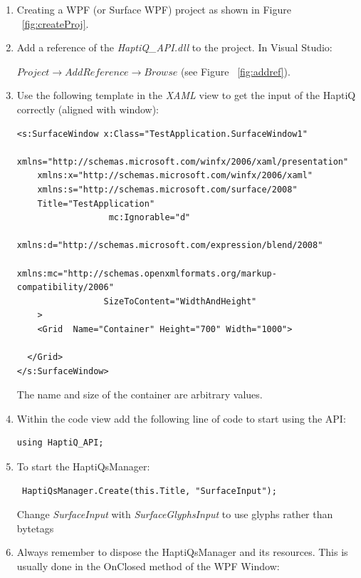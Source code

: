 \documentclass[a4paper]{article}
\begin{document}
\begin{enumerate}
\item Creating a WPF (or Surface WPF) project as shown in Figure ~\ref{fig:createProj}. 

\item Add a reference of the \textit{HaptiQ\_API.dll} to the project. In Visual Studio:

\textit{$ Project \rightarrow Add Reference \rightarrow Browse $} (see Figure ~\ref{fig:addref}).

\item Use the following template in the \textit{XAML} view to get the input of the HaptiQ correctly (aligned with window):

\lstset{language=XML}
\begin{lstlisting}
<s:SurfaceWindow x:Class="TestApplication.SurfaceWindow1"
    xmlns="http://schemas.microsoft.com/winfx/2006/xaml/presentation"
    xmlns:x="http://schemas.microsoft.com/winfx/2006/xaml"
    xmlns:s="http://schemas.microsoft.com/surface/2008"
    Title="TestApplication"
                  mc:Ignorable="d"
                 xmlns:d="http://schemas.microsoft.com/expression/blend/2008" 
                 xmlns:mc="http://schemas.openxmlformats.org/markup-compatibility/2006" 
                 SizeToContent="WidthAndHeight"
    >
    <Grid  Name="Container" Height="700" Width="1000">

  </Grid>
</s:SurfaceWindow>
\end{lstlisting}

The name and size of the container are arbitrary values. 

\item Within the code view add the following line of code to start using the API:
\lstset{style=sharpc1}
\begin{lstlisting}
using HaptiQ_API; 
\end{lstlisting}

\item To start the HaptiQsManager:
\lstset{style=sharpc1}
\begin{lstlisting}
 HaptiQsManager.Create(this.Title, "SurfaceInput");
\end{lstlisting}

Change \textit{SurfaceInput} with \textit{SurfaceGlyphsInput} to use glyphs rather than bytetags

\item Always remember to dispose the HaptiQsManager and its resources. This is usually done in the OnClosed method of the WPF Window:


\end{enumerate}
\end{document}
